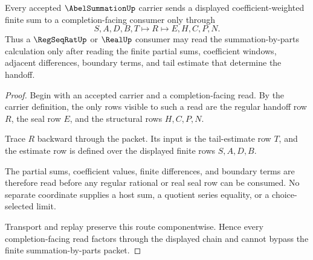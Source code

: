 \begin{theorem}
\label{thm:abel-summation-partial-sum-handoff}
Every accepted $\AbelSummationUp$ carrier sends a displayed coefficient-weighted finite sum to a completion-facing consumer only through
$$
S,A,D,B,T \longmapsto R \longmapsto E,H,C,P,N.
$$
Thus a $\RegSeqRatUp$ or $\RealUp$ consumer may read the summation-by-parts calculation only after reading the finite partial sums, coefficient windows, adjacent differences, boundary terms, and tail estimate that determine the handoff.
\end{theorem}
\begin{proof}
Begin with an accepted carrier and a completion-facing read. By the carrier definition, the only rows visible to such a read are the regular handoff row $R$, the seal row $E$, and the structural rows $H,C,P,N$.

Trace $R$ backward through the packet. Its input is the tail-estimate row $T$, and the estimate row is defined over the displayed finite rows $S,A,D,B$.

The partial sums, coefficient values, finite differences, and boundary terms are therefore read before any regular rational or real seal row can be consumed. No separate coordinate supplies a host sum, a quotient series equality, or a choice-selected limit.

Transport and replay preserve this route componentwise. Hence every completion-facing read factors through the displayed chain and cannot bypass the finite summation-by-parts packet.
\end{proof}

